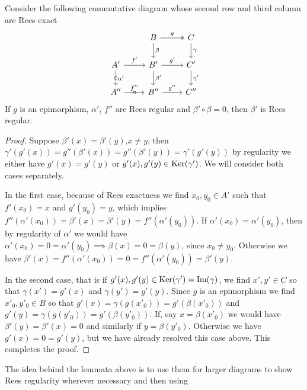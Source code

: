 \begin{lemma}\label{reglemma2}
    Consider the following commutative diagram whose second row and third column are Rees exact
    \[\begin{tikzcd}
        & B & C \\
        {A'} & {B'} & {C'} \\
        {A''} & {B''} & {C''}
        \arrow["g", two heads, from=1-2, to=1-3]
        \arrow["\beta", from=1-2, to=2-2]
        \arrow["\gamma", from=1-3, to=2-3]
        \arrow["{f'}", from=2-1, to=2-2]
        \arrow["{\alpha'}", "\circ"{marking}, from=2-1, to=3-1]
        \arrow["{g'}", from=2-2, to=2-3]
        \arrow["{\beta'}", from=2-2, to=3-2]
        \arrow["{\gamma'}", from=2-3, to=3-3]
        \arrow["{f''}", "\circ"{marking}, from=3-1, to=3-2]
        \arrow["{g''}", from=3-2, to=3-3]
    \end{tikzcd}\]
    If $g$ is an epimorphism, $\alpha'$, $f''$ are Rees regular and $\beta'\circ\beta = 0$, then $\beta'$ is Rees regular.
\end{lemma}
\begin{proof}[Proof]
    Suppose $\beta'(x)=\beta'(y)$,$x\neq y$, then $\gamma'(g'(x))=g''(\beta'(x))=g''(\beta'(y)) = \gamma'(g'(y))$ by 
    regularity we either have $g'(x)=g'(y)$ or $g'(x),g'(y)\in\mathrm{Ker}(\gamma')$. We will consider both cases separately. \par 
    In the first case, because of Rees exactness 
    we find $x_0,y_0\in A'$ such that $f'(x_0)=x$ and $g'(y_0)=y$, which implies 
    $f''(\alpha'(x_0))=\beta'(x)=\beta'(y)=f''(\alpha'(y_0))$. If $\alpha'(x_0)=\alpha'(y_0)$, then by regularity 
    of $\alpha'$ we would have $\alpha'(x_0)=0=\alpha'(y_0) \implies \beta(x)=0=\beta(y)$, since $x_0\neq y_0$.
    Otherwise we have $\beta'(x)=f''(\alpha'(x_0))=0=f''(\alpha'(y_0))=\beta'(y)$.\par
    In the second case, that is if $g'(x),g'(y)\in\mathrm{Ker}(\gamma')=\mathrm{Im}(\gamma)$, we find $x',y'\in C$ so that 
    $\gamma(x')=g'(x)$ and $\gamma(y')=g'(y)$. Since $g$ is an epimorphism we find $x'_0,y'_0\in B$ so that 
    $g'(x) = \gamma(g(x'_0))= g'(\beta(x'_0))$ and $g'(y)=\gamma(g(y'_0))=g'(\beta(y'_0))$. If, say 
    $x = \beta(x'_0)$ we would have $\beta'(y)=\beta'(x)=0$ and similarly if $y=\beta(y'_0)$. Otherwise we have $g'(x)=0=g'(y)$, but we have already resolved this case above. This completes the proof.
\end{proof}
The idea behind the lemmata above is to use them for larger diagrams to show Rees regularity wherever necessary and then using
